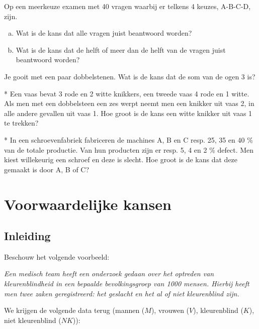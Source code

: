 \documentclass[12pt,twoside]{article}
\begin{document}
\begin{oefening}
Op een meerkeuze examen met 40 vragen waarbij er telkens 4 keuzes, A-B-C-D, zijn.
\begin{enumerate}[(a)]
  \item Wat is de kans dat alle vragen juist beantwoord worden?
  \item Wat is de kans dat de helft of meer dan de helft van de vragen juist beantwoord worden?
\end{enumerate}
\end{oefening}


\begin{oefening}
Je gooit met een paar dobbelstenen. Wat is de kans dat de som van de ogen 3 is?
\end{oefening}

\begin{oefening}*
Een vaas bevat 3 rode en 2 witte knikkers, een tweede vaas 4 rode en 1 witte. Als men met een dobbelsteen een zes werpt neemt men een knikker uit vaas 2, in alle andere gevallen uit vaas 1. Hoe groot is de kans een witte knikker uit vaas 1 te trekken?
\end{oefening}

\begin{oefening}*
In een schroevenfabriek fabriceren de machines A, B en C resp. 25, 35 en 40 \% van de totale productie. Van hun producten zijn er resp. 5, 4 en 2 \% defect. Men kiest willekeurig een schroef en deze is slecht. Hoe groot is de kans dat deze gemaakt is door A, B of C?
\end{oefening}

\pagebreak
\section{Voorwaardelijke kansen}

\subsection{Inleiding}

Beschouw het volgende voorbeeld:

{\em Een medisch team heeft een onderzoek gedaan over het optreden van kleurenblindheid in een bepaalde bevolkingsgroep van 1000 mensen. Hierbij heeft men twee zaken geregistreerd: het geslacht en het al of niet kleurenblind zijn.}

We krijgen de volgende data terug (mannen ($M$), vrouwen ($V$), kleurenblind ($K$), niet kleurenblind ($NK$)):
\end{document}
